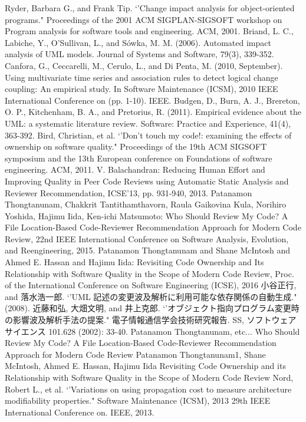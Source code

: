 \documentclass{fose2016}           %
\begin{document}
\begin{thebibliography}{10}
Ryder, Barbara G., and Frank Tip. `'Change impact analysis for object-oriented programs." Proceedings of the 2001 ACM SIGPLAN-SIGSOFT workshop on Program analysis for software tools and engineering. ACM, 2001.
Briand, L. C., Labiche, Y., O’Sullivan, L., and Sówka, M. M. (2006). Automated impact analysis of UML models. Journal of Systems and Software, 79(3), 339-352.
 Canfora, G., Ceccarelli, M., Cerulo, L., and Di Penta, M. (2010, September). Using multivariate time series and association rules to detect logical change coupling: An empirical study. In Software Maintenance (ICSM), 2010 IEEE International Conference on (pp. 1-10). IEEE.
Budgen, D., Burn, A. J., Brereton, O. P., Kitchenham, B. A., and Pretorius, R. (2011). Empirical evidence about the UML: a systematic literature review. Software: Practice and Experience, 41(4), 363-392.
Bird, Christian, et al. `'Don't touch my code!: examining the effects of ownership on software quality." Proceedings of the 19th ACM SIGSOFT symposium and the 13th European conference on Foundations of software engineering. ACM, 2011.
V. Balachandran: Reducing Human Effort and Improving Quality in Peer Code Reviews using Automatic Static Analysis and Reviewer Recommendation, ICSE'13, pp. 931-940, 2013.
Patanamon Thongtanunam, Chakkrit Tantithamthavorn, Raula Gaikovina Kula, Norihiro Yoshida, Hajimu Iida, Ken-ichi Matsumoto: Who Should Review My Code? A File Location-Based Code-Reviewer Recommendation Approach for Modern Code Review, 22nd IEEE International Conference on Software Analysis, Evolution, and Reengineering, 2015.
Patanamon Thongtanunam and Shane McIntosh and Ahmed E. Hassan and Hajimu Iida: Revisiting Code Ownership and Its Relationship with Software Quality in the Scope of Modern Code Review, Proc. of the International Conference on Software Engineering (ICSE), 2016
小谷正行, and 落水浩一郎. `'UML 記述の変更波及解析に利用可能な依存関係の自動生成." (2008).
近藤和弘, 大畑文明, and 井上克郎. `'オブジェクト指向プログラム変更時の影響波及解析手法の提案." 電子情報通信学会技術研究報告. SS, ソフトウェアサイエンス 101.628 (2002): 33-40.
Patanamon Thongtanunam, etc...
Who Should Review My Code? A File Location-Based Code-Reviewer Recommendation Approach for Modern Code Review
Patanamon Thongtanunam1, Shane McIntosh, Ahmed E. Hassan, Hajimu Iida Revisiting Code Ownership and its Relationship with Software Quality in the Scope of Modern Code Review
Nord, Robert L., et al. `'Variations on using propagation cost to measure architecture modifiability properties." Software Maintenance (ICSM), 2013 29th IEEE International Conference on. IEEE, 2013.


\end{thebibliography}
\end{document}
